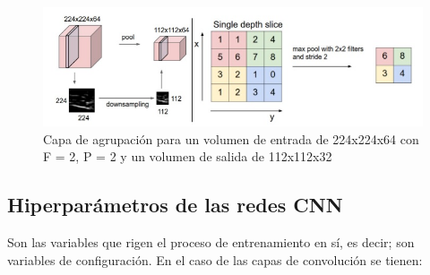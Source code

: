 \begin{figure}[H]
    \centering
    \includegraphics[scale=0.6]{Recursos/maxPolling.jpg}
    \caption{Capa de agrupación para un volumen de entrada de 224x224x64 con F = 2, P = 2 y un volumen de salida de 112x112x32}
    \label{maxPooling}
\end{figure}
\subsection{Hiperparámetros de las redes CNN}
Son las variables que rigen el proceso de entrenamiento en sí, es decir; son variables de configuración. En el caso de las capas de convolución se tienen:
